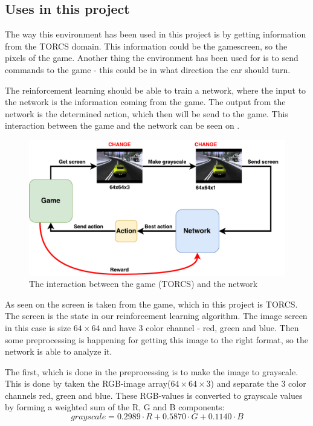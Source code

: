 \subsection{Uses in this project}      
The way this environment has been used in this project is by getting information from the TORCS domain. This information could be the gamescreen, so the pixels of the game. Another thing the environment has been used for is to send commands to the game - this could be in what direction the car should turn.

The reinforcement learning should be able to train a network, where the input to the network is the information coming from the game. The output from the network is the determined action, which then will be send to the game. This interaction between the game and the network can be seen on .    
 
\begin{figure}[H]
	\centering
	\includegraphics[width=1\textwidth]{Figures/Architecture/TORCS_interaction.pdf}
	\caption{The interaction between the game (TORCS) and the network }
	\label{fig:TORCS_interaction}
\end{figure}

 
As seen on  the screen is taken from the game, which in this project is TORCS. The screen is the state in our reinforcement learning algorithm. The image screen in this case is size $64 \times 64$ and have 3 color channel - red, green and blue. Then some preprocessing is happening for getting this image to the right format, so the network is able to analyze it.

The first, which is done in the preprocessing is to make the image to grayscale. This is done by taken the RGB-image array($64 \times 64 \times 3$) and separate the 3 color channels red, green and blue. These RGB-values is converted to grayscale values by forming a weighted sum of the R, G and B components:
\begin{equation}
grayscale = 0.2989 \cdot R + 0.5870 \cdot G + 0.1140 \cdot B 
\end{equation}  

